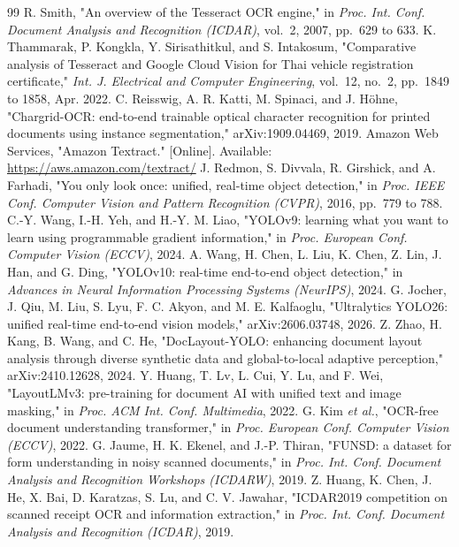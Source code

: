 \begin{thebibliography}{99}
 R. Smith, "An overview of the Tesseract OCR engine," in \emph{Proc. Int. Conf. Document Analysis and Recognition (ICDAR)}, vol.~2, 2007, pp.~629 to 633.
 K. Thammarak, P. Kongkla, Y. Sirisathitkul, and S. Intakosum, "Comparative analysis of Tesseract and Google Cloud Vision for Thai vehicle registration certificate," \emph{Int. J. Electrical and Computer Engineering}, vol.~12, no.~2, pp.~1849 to 1858, Apr. 2022.
 C. Reisswig, A. R. Katti, M. Spinaci, and J. H{\"o}hne, "Chargrid-OCR: end-to-end trainable optical character recognition for printed documents using instance segmentation," arXiv:1909.04469, 2019.
 Amazon Web Services, "Amazon Textract." [Online]. Available: \url{https://aws.amazon.com/textract/}
 J. Redmon, S. Divvala, R. Girshick, and A. Farhadi, "You only look once: unified, real-time object detection," in \emph{Proc. IEEE Conf. Computer Vision and Pattern Recognition (CVPR)}, 2016, pp.~779 to 788.
 C.-Y. Wang, I.-H. Yeh, and H.-Y. M. Liao, "YOLOv9: learning what you want to learn using programmable gradient information," in \emph{Proc. European Conf. Computer Vision (ECCV)}, 2024.
 A. Wang, H. Chen, L. Liu, K. Chen, Z. Lin, J. Han, and G. Ding, "YOLOv10: real-time end-to-end object detection," in \emph{Advances in Neural Information Processing Systems (NeurIPS)}, 2024.
 G. Jocher, J. Qiu, M. Liu, S. Lyu, F. C. Akyon, and M. E. Kalfaoglu, "Ultralytics YOLO26: unified real-time end-to-end vision models," arXiv:2606.03748, 2026.
 Z. Zhao, H. Kang, B. Wang, and C. He, "DocLayout-YOLO: enhancing document layout analysis through diverse synthetic data and global-to-local adaptive perception," arXiv:2410.12628, 2024.
 Y. Huang, T. Lv, L. Cui, Y. Lu, and F. Wei, "LayoutLMv3: pre-training for document AI with unified text and image masking," in \emph{Proc. ACM Int. Conf. Multimedia}, 2022.
 G. Kim \emph{et al.}, "OCR-free document understanding transformer," in \emph{Proc. European Conf. Computer Vision (ECCV)}, 2022.
 G. Jaume, H. K. Ekenel, and J.-P. Thiran, "FUNSD: a dataset for form understanding in noisy scanned documents," in \emph{Proc. Int. Conf. Document Analysis and Recognition Workshops (ICDARW)}, 2019.
 Z. Huang, K. Chen, J. He, X. Bai, D. Karatzas, S. Lu, and C. V. Jawahar, "ICDAR2019 competition on scanned receipt OCR and information extraction," in \emph{Proc. Int. Conf. Document Analysis and Recognition (ICDAR)}, 2019.

\end{thebibliography}
